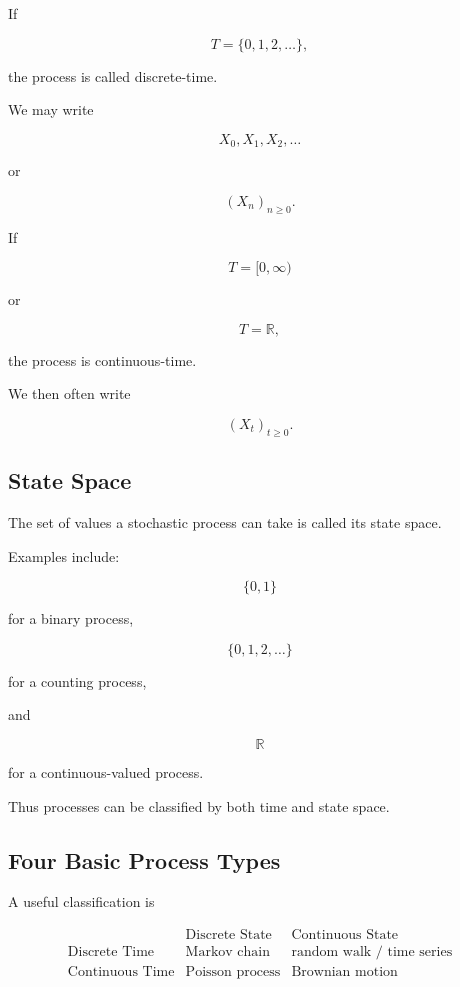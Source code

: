 If

\[
T
=
\{0,1,2,\ldots\},
\]

the process is called discrete-time.

We may write

\[
\boxed{
X_0,X_1,X_2,\ldots
}
\]

or

\[
\boxed{
(X_n)_{n\geq0}.
}
\]

If

\[
T=[0,\infty)
\]

or

\[
T=\mathbb{R},
\]

the process is continuous-time.

We then often write

\[
\boxed{
(X_t)_{t\geq0}.
}
\]

\subsection{State Space}
\label{subsec:stochastic-state-space}

The set of values a stochastic process can take is called its state
space.

Examples include:

\[
\boxed{
\{0,1\}
}
\]

for a binary process,

\[
\boxed{
\{0,1,2,\ldots\}
}
\]

for a counting process,

and

\[
\boxed{
\mathbb{R}
}
\]

for a continuous-valued process.

Thus processes can be classified by both time and state space.

\subsection{Four Basic Process Types}
\label{subsec:four-process-types}

A useful classification is

\[
\begin{array}{c|c|c}
&
\text{Discrete State}
&
\text{Continuous State}
\\
\hline
\text{Discrete Time}
&
\text{Markov chain}
&
\text{random walk / time series}
\\[1mm]
\text{Continuous Time}
&
\text{Poisson process}
&
\text{Brownian motion}
\end{array}
\]

